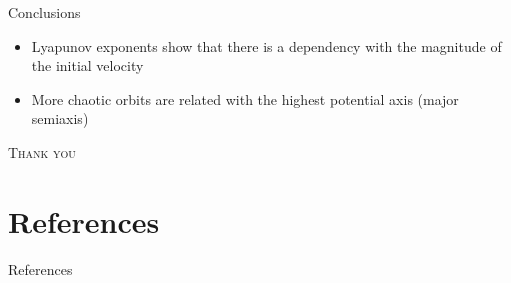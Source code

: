 \documentclass{beamer}
\begin{document}
\begin{frame}{Conclusions}
	\begin{itemize}
		\item Lyapunov exponents show that there is a dependency
		with the magnitude of the initial velocity
		\item More chaotic orbits are related with the highest potential axis (major semiaxis)
	\end{itemize}
\end{frame}

\begin{frame}
	\centering
	\Huge
	\scshape
	Thank you
\end{frame}

\section{References}
\begin{frame}{References}
	\nocite{*}
	\printbibliography
\end{frame}
\end{document}
